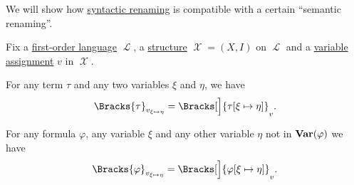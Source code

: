 \begin{proposition}\label{thm:renaming_assignment_compatibility}
  We will show how \hyperref[rem:first_order_substitution_renaming_justification]{syntactic renaming} is compatible with a certain \enquote{semantic renaming}.

  Fix a \hyperref[def:first_order_syntax]{first-order language} \( \mscrL \), a \hyperref[def:first_order_structure]{structure} \( \mscrX = (X, I) \) on \( \mscrL \) and a \hyperref[def:first_order_valuation/variable_assignment]{variable assignment} \( v \) in \( \mscrX \).

  \begin{thmenum}
     For any term \( \tau \) and any two variables \( \xi \) and \( \eta \), we have
    \begin{equation}\label{eq:thm:renaming_assignment_compatibility/terms}
      \Bracks{\tau}_{v_{\xi \mapsto \eta}}
      =
      \Bracks[\Big]{\tau[\xi \mapsto \eta]}_v.
    \end{equation}

     For any formula \( \varphi \), any variable \( \xi \) and any other variable \( \eta \) not in \( \operatorname{\mathbf{Var}}(\varphi) \) we have
    \begin{equation}\label{eq:thm:renaming_assignment_compatibility/formulas}
      \Bracks{\varphi}_{v_{\xi \mapsto \eta}}
      =
      \Bracks[\Big]{\varphi[\xi \mapsto \eta]}_v.
    \end{equation}
  \end{thmenum}
\end{proposition}
